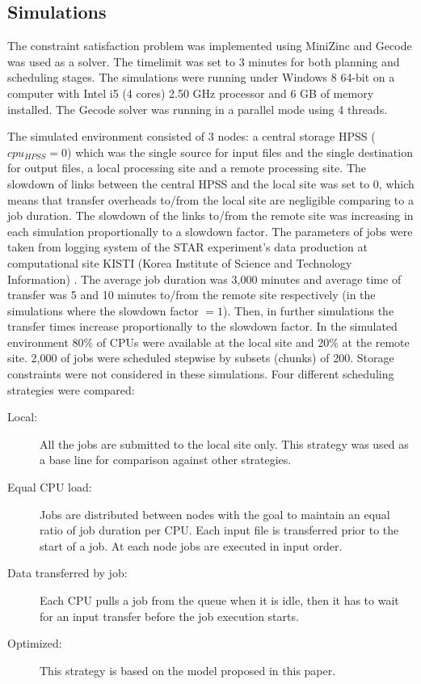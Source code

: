\documentclass[english]{ddny}
\begin{document}
\subsection{Simulations}
The constraint satisfaction problem was implemented using MiniZinc \cite{MiniZinc} and Gecode \cite{Gecode} was used as a solver. The timelimit was set to 3 minutes for both planning and scheduling stages. The simulations were running under Windows 8 64-bit on a computer with Intel i5 (4 cores) 2.50 GHz processor and 6 GB of memory installed. The Gecode solver was running in a parallel mode using 4 threads. 

The simulated environment consisted of 3 nodes: a central storage HPSS ($cpu_{HPSS}=0$) which was the single source for input files and the single destination for output files, a local processing site and a remote processing site. The slowdown of links between the central HPSS and the local site was set to 0, which means that transfer overheads to/from the local site are negligible comparing to a job duration. The slowdown of the links to/from the remote site was increasing in each simulation proportionally to a slowdown factor. The parameters of jobs were taken from logging system of the STAR experiment's data production at computational site KISTI (Korea Institute of Science and Technology Information) \cite{KISTI}. The average job duration was 3,000 minutes and average time of transfer was 5 and 10 minutes to/from the remote site respectively (in the simulations where the slowdown factor $= 1$). Then, in further simulations the transfer times increase proportionally to the slowdown factor. In the simulated environment 80\% of CPUs were available at the local site and 20\% at the remote site. 2,000 of jobs were scheduled stepwise by subsets (chunks) of 200. Storage constraints were not considered in these simulations. Four different scheduling strategies were compared:
\begin{description}
\item[Local:] All the jobs are submitted to the local site only. This strategy was used as a base line for comparison against other strategies.
\item[Equal CPU load:] Jobs are distributed between nodes with the goal to maintain an equal ratio of job duration per CPU. Each input file is transferred prior to the start of a job. At each node jobs are executed in input order.
\item[Data transferred by job:] Each CPU pulls a job from the queue when it is idle, then it has to wait for an input transfer before the job execution starts.
\item[Optimized:] This strategy is based on the model proposed in this paper.
\end{description}
\end{document}
